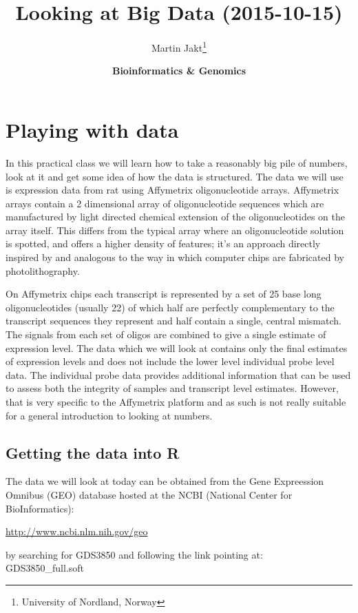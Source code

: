 \documentclass[11pt]{article}
\author{Martin Jakt\thanks{University of Nordland, Norway}}
\date{\textbf{Bioinformatics \& Genomics}}
\title{\textbf{Looking at Big Data} (2015-10-15)}
\begin{document}
\maketitle

\section{Playing with data}
\label{sec-1}
In this practical class we will learn how to take a reasonably
big pile of numbers, look at it and get some idea of how the
data is structured. The data we will use is expression data from
rat using Affymetrix oligonucleotide arrays. Affymetrix arrays contain
a 2 dimensional array of oligonucleotide sequences which are manufactured
by light directed chemical extension of the oligonucleotides on the
array itself. This differs from the typical array where an oligonucleotide
solution is spotted, and offers a higher density of features; it's
an approach directly inspired by and analogous to the way in which
computer chips are fabricated by photolithography.

On Affymetrix chips each transcript is represented by a set of 25 base
long oligonucleotides (usually 22) of which half are perfectly 
complementary to the transcript sequences they represent and half contain
a single, central mismatch. The signals from each set of oligos
are combined to give a single estimate of expression level. The data which
we will look at contains only the final estimates of expression levels and
does not include the lower level individual probe level data. The individual
probe data provides additional information that can be used to assess both
the integrity of samples and transcript level estimates. However, that
is very specific to the Affymetrix platform and as such is not really
suitable for a general introduction to looking at numbers.

\subsection{Getting the data into R}
\label{sec-1-1}
The data we will look at today can be obtained from the
Gene Expreession Omnibus (GEO) database hosted at the
NCBI (National Center for BioInformatics):

\url{http://www.ncbi.nlm.nih.gov/geo}

by searching for GDS3850 and following the link pointing at:\\
GDS3850\_full.soft\\
\end{document}
